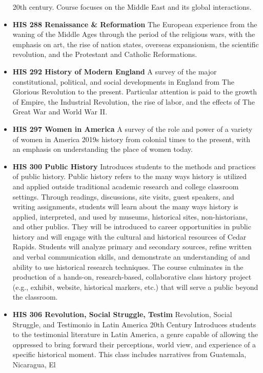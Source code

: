 \documentclass[
  letterpaper,
]{scrbook}
\begin{document}
\begin{itemize}
  20th century. Course focuses on the Middle East and its global
  interactions.
\item
  \textbf{HIS 288 Renaissance \& Reformation} The European experience
  from the waning of the Middle Ages through the period of the religious
  wars, with the emphasis on art, the rise of nation states, overseas
  expansionism, the scientific revolution, and the Protestant and
  Catholic Reformations.
\item
  \textbf{HIS 292 History of Modern England} A survey of the major
  constitutional, political, and social developments in England from The
  Glorious Revolution to the present. Particular attention is paid to
  the growth of Empire, the Industrial Revolution, the rise of labor,
  and the effects of The Great War and World War II.
\item
  \textbf{HIS 297 Women in America} A survey of the role and power of a
  variety of women in America 2019s history from colonial times to the
  present, with an emphasis on understanding the place of women today.
\item
  \textbf{HIS 300 Public History} Introduces students to the methods and
  practices of public history. Public history refers to the many ways
  history is utilized and applied outside traditional academic research
  and college classroom settings. Through readings, discussions, site
  visits, guest speakers, and writing assignments, students will learn
  about the many ways history is applied, interpreted, and used by
  museums, historical sites, non-historians, and other publics. They
  will be introduced to career opportunities in public history and will
  engage with the cultural and historical resources of Cedar Rapids.
  Students will analyze primary and secondary sources, refine written
  and verbal communication skills, and demonstrate an understanding of
  and ability to use historical research techniques. The course
  culminates in the production of a hands-on, research-based,
  collaborative class history project (e.g., exhibit, website,
  historical markers, etc.) that will serve a public beyond the
  classroom.
\item
  \textbf{HIS 306 Revolution, Social Struggle, Testim} Revolution,
  Social Struggle, and Testimonio in Latin America 20th Century
  Introduces students to the testimonial literature in Latin America, a
  genre capable of allowing the oppressed to bring forward their
  perceptions, world view, and experience of a specific historical
  moment. This class includes narratives from Guatemala, Nicaragua, El

\end{itemize}
\end{document}

